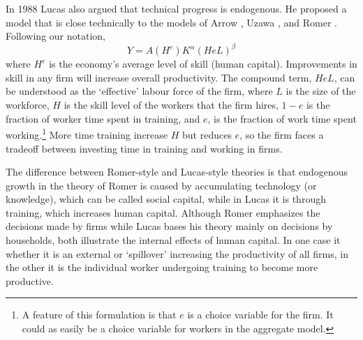 In 1988 Lucas also argued that technical progress is endogenous. He proposed a model that is close technically to the models of Arrow \cite{arrowEconomicImplicationsLearning1962}, Uzawa \cite{uzawaOptimumTechnicalChange1965}, and Romer \cite{romerIncreasingReturnsLongRun1986}. Following our notation, 
\[ Y = A(H^e) K^\alpha (HeL)^\beta \] 
where $H^e$ is the economy's average level of skill (human capital).  Improvements in skill in any firm will increase overall productivity. The compound term, $HeL$,  can be understood as the `effective' labour force of the firm, where $L$ is the size of the workforce, $H$ is the skill level of the workers that the firm hires,  $1-e$ is the fraction of worker time spent in training, and $e$, is the fraction of work time spent working.\footnote{A feature of this formulation is that $e$ is a choice variable for the firm. It could as easily be a choice variable for workers in the aggregate model.} 
More time training increase $H$ but reduces $e$, so the firm faces a tradeoff between investing time in training and working in firms.

The difference between Romer-style and Lucas-style theories is that endogenous growth in the theory of Romer is caused by accumulating technology (or knowledge), which can be called social capital, while in Lucas it is through training, which increases human capital. %
Although Romer emphasizes the decisions made by firms while Lucas bases his theory mainly on decisions by households, both illustrate the internal effects of human capital. In one case it whether it is an external or `spillover' increasing the productivity of all firms, in the other it is the individual worker undergoing training to become more productive. 

